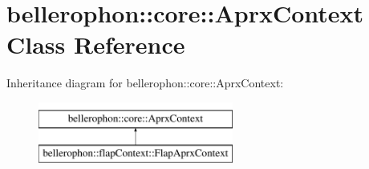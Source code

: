 \hypertarget{classbellerophon_1_1core_1_1AprxContext}{}\section{bellerophon\+:\+:core\+:\+:Aprx\+Context Class Reference}
\label{classbellerophon_1_1core_1_1AprxContext}
Inheritance diagram for bellerophon\+:\+:core\+:\+:Aprx\+Context\+:\begin{figure}[H]
\begin{center}
\leavevmode
\includegraphics[height=2.000000cm]{classbellerophon_1_1core_1_1AprxContext}
\end{center}
\end{figure}
